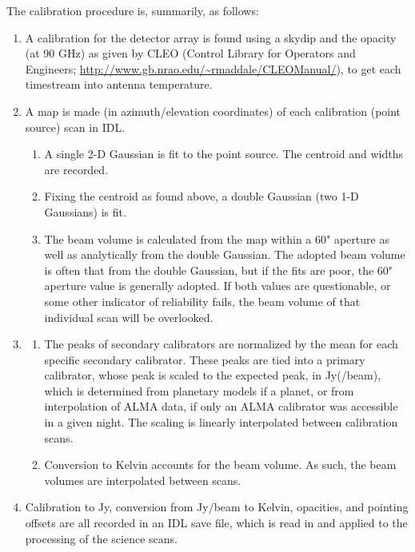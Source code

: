 \documentclass[twocolumn]{aastex62}
\begin{document}
The calibration procedure is, summarily, as follows:
\begin{enumerate}
    \item A calibration for the detector array is found using a skydip and the
        opacity (at 90 GHz) as given by CLEO (Control Library for Operators and
        Engineers; \url{http://www.gb.nrao.edu/~rmaddale/CLEOManual/}), to get
        each timestream into
        antenna temperature.
    \item A map is made (in azimuth/elevation coordinates) of each calibration
        (point source) scan in IDL.
        \begin{enumerate}
            \item A single 2-D Gaussian is fit to the point source. The centroid and widths are recorded.
            \item Fixing the centroid as found above, a double Gaussian (two 1-D Gaussians) is fit.
            \item The beam volume is calculated from the map within a 60"
                aperture as well as analytically from the double Gaussian. The
                adopted beam volume is often that from the double Gaussian, but
                if the fits are poor, the 60" aperture value is generally
                adopted. If both values are questionable, or some other
                indicator of reliability fails, the beam volume of that
                individual scan will be overlooked.
        \end{enumerate}
    \item
        \begin{enumerate}
            \item The peaks of secondary calibrators are normalized by the mean
                for each specific secondary calibrator. These peaks are tied
                into a primary calibrator, whose peak is scaled to the expected
                peak, in Jy(/beam), which is determined from planetary models
                if a planet, or from interpolation of ALMA data, if only an
                ALMA calibrator was accessible in a given night. The scaling is
                linearly interpolated between calibration scans.
            \item Conversion to Kelvin accounts for the beam volume. As such,
                the beam volumes are interpolated between scans.
        \end{enumerate}
    \item Calibration to Jy, conversion from Jy/beam to Kelvin, opacities, and
        pointing offsets are all recorded in an IDL save file, which is read in
        and applied to the processing of the science scans.
\end{enumerate}
\end{document}
